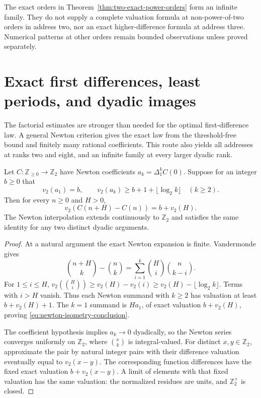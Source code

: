 \begin{remark}
The exact orders in Theorem~\ref{thm:two-exact-power-orders} form an
infinite family. They do not supply a complete valuation formula at
non-power-of-two orders in address two, nor an exact higher-difference
formula at address three. Numerical patterns at other orders remain
bounded observations unless proved separately.
\end{remark}

\section{Exact first differences, least periods, and dyadic images}
\label{sec:sharp-periods-final}

The factorial estimates are stronger than needed for the optimal
first-difference law. A general Newton criterion gives the exact law
from the threshold-free bound and finitely many rational coefficients.
This route also yields all addresses at ranks two and eight, and an
infinite family at every larger dyadic rank.

\begin{lemma}
\label{lem:newton-exact-isometry-criterion}
Let $C:\mathbb Z_{\geq0}\to\mathbb Z_2$ have Newton coefficients
$a_k=\Delta_1^kC(0)$. Suppose for an integer $b\geq0$ that
\begin{equation}
 v_2(a_1)=b,\qquad
 v_2(a_k)\geq b+1+\lfloor\log_2k\rfloor\quad(k\geq2).
 \label{eq:newton-isometry-criterion}
\end{equation}
Then for every $n\geq0$ and $H>0$,
\begin{equation}
 v_2(C(n+H)-C(n))=b+v_2(H).
 \label{eq:newton-isometry-conclusion}
\end{equation}
The Newton interpolation extends continuously to $\mathbb Z_2$ and
satisfies the same identity for any two distinct dyadic arguments.
\end{lemma}

\begin{proof}
At a natural argument the exact Newton expansion is finite.
Vandermonde gives
\[
 \binom{n+H}{k}-\binom nk
   =\sum_{i=1}^k\binom Hi\binom n{k-i}.
\]
For $1\leq i\leq H$,
$v_2(\binom Hi)\geq v_2(H)-v_2(i)
 \geq v_2(H)-\lfloor\log_2k\rfloor$. Terms with $i>H$ vanish.
Thus each Newton summand with $k\geq2$ has valuation at least
$b+v_2(H)+1$. The $k=1$ summand is $Ha_1$, of exact valuation
$b+v_2(H)$, proving \eqref{eq:newton-isometry-conclusion}.

The coefficient hypothesis implies $a_k\to0$ dyadically, so the
Newton series converges uniformly on $\mathbb Z_2$, where
$\binom xk$ is integral-valued. For distinct $x,y\in\mathbb Z_2$,
approximate the pair by natural integer pairs with their difference
valuation eventually equal to $v_2(x-y)$. The corresponding function
differences have the fixed exact valuation $b+v_2(x-y)$.
A limit of elements with that fixed valuation has the same valuation:
the normalized residues are units, and $\mathbb Z_2^\times$ is closed.
\end{proof}

